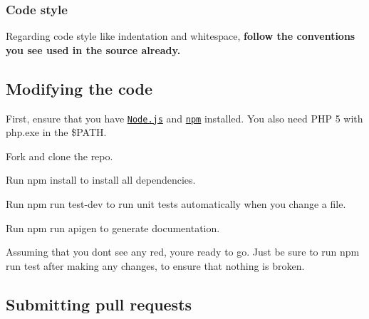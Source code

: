\subsubsection*{Code style}

Regarding code style like indentation and whitespace, {\bfseries follow the conventions you see used in the source already.}

\subsection*{Modifying the code}

First, ensure that you have \href{http://nodejs.org/}{\tt Node.\+js} and \href{http://npmjs.org/}{\tt npm} installed. You also need P\+HP 5 with php.\+exe in the \$\+P\+A\+TH.


\begin{DoxyEnumerate}
\item Fork and clone the repo.
\end{DoxyEnumerate}
\begin{DoxyEnumerate}
\item Run {\ttfamily npm install} to install all dependencies.
\end{DoxyEnumerate}
\begin{DoxyEnumerate}
\item Run {\ttfamily npm run test-\/dev} to run unit tests automatically when you change a file.
\end{DoxyEnumerate}
\begin{DoxyEnumerate}
\item Run {\ttfamily npm run apigen} to generate documentation.
\end{DoxyEnumerate}

Assuming that you don\textquotesingle{}t see any red, you\textquotesingle{}re ready to go. Just be sure to run {\ttfamily npm run test} after making any changes, to ensure that nothing is broken.

\subsection*{Submitting pull requests}


